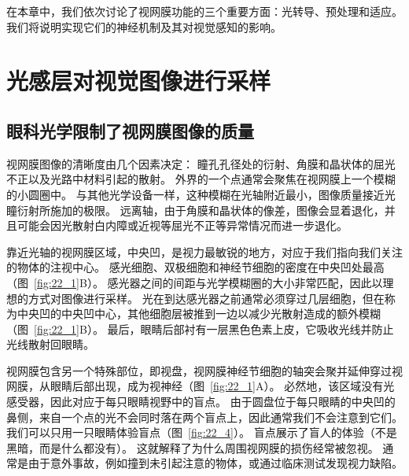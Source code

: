 在本章中，我们依次讨论了视网膜功能的三个重要方面：光转导、预处理和适应。
我们将说明实现它们的神经机制及其对视觉感知的影响。



\section{光感层对视觉图像进行采样}

\subsection{眼科光学限制了视网膜图像的质量}

视网膜图像的清晰度由几个因素决定：
瞳孔孔径处的衍射、角膜和晶状体的屈光不正以及光路中材料引起的散射。
外界的一个点通常会聚焦在视网膜上一个模糊的小圆圈中。
与其他光学设备一样，这种模糊在光轴附近最小，图像质量接近光瞳衍射所施加的极限。
远离轴，由于角膜和晶状体的像差，图像会显着退化，并且可能会因光散射白内障或近视等屈光不正等异常情况而进一步退化。


靠近光轴的视网膜区域，中央凹，是视力最敏锐的地方，对应于我们指向我们关注的物体的注视中心。
感光细胞、双极细胞和神经节细胞的密度在中央凹处最高（图~\ref{fig:22_1}B）。
感光器之间的间距与光学模糊圈的大小非常匹配，因此以理想的方式对图像进行采样。
光在到达感光器之前通常必须穿过几层细胞，但在称为中央凹的中央凹中心，其他细胞层被推到一边以减少光散射造成的额外模糊（图~\ref{fig:22_1}B）。
最后，眼睛后部衬有一层黑色色素上皮，它吸收光线并防止光线散射回眼睛。


视网膜包含另一个特殊部位，即视盘，视网膜神经节细胞的轴突会聚并延伸穿过视网膜，从眼睛后部出现，成为视神经（图~\ref{fig:22_1}A）。
必然地，该区域没有光感受器，因此对应于每只眼睛视野中的盲点。
由于圆盘位于每只眼睛的中央凹的鼻侧，来自一个点的光不会同时落在两个盲点上，因此通常我们不会注意到它们。
我们可以只用一只眼睛体验盲点（图~\ref{fig:22_4}）。
盲点展示了盲人的体验（不是黑暗，而是什么都没有）。
这就解释了为什么周围视网膜的损伤经常被忽视。
通常是由于意外事故，例如撞到未引起注意的物体，或通过临床测试发现视力缺陷。


